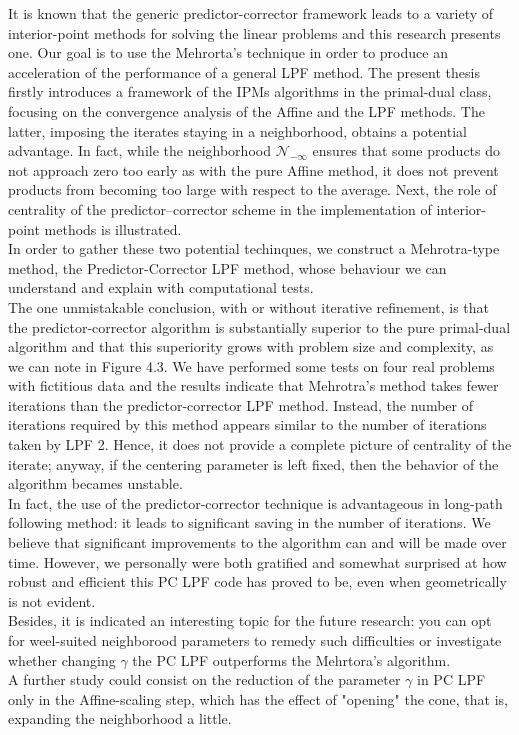 \documentclass[a4paper,10 pt,titlepage,twoside]{report}
\theoremstyle{plain}
\theoremstyle{definition}
\theoremstyle{remark}
\begin{document}
{{It is known that the generic predictor-corrector framework leads to a variety of interior-point methods for solving the linear problems and this research presents one. Our goal is to use the Mehrorta's technique in order to produce an acceleration of the performance of a general LPF method. The present thesis firstly introduces a framework of the IPMs algorithms in
the primal-dual class, focusing on the convergence analysis of the Affine and the LPF methods. The latter, imposing the iterates staying in a neighborhood,  obtains a potential advantage. In fact, while the neighborhood $\mathcal{N}_{-\infty}$ ensures that some products do not approach zero too early as with the pure Affine method, it does not prevent products from becoming too large with respect to the average. Next, the role of centrality of the predictor–corrector scheme in the implementation of interior-point methods is illustrated.\\
In order to gather these two potential techinques, we construct a Mehrotra-type method, the Predictor-Corrector LPF method, whose
behaviour we can understand and explain with computational tests.\\
The one unmistakable conclusion, with or without iterative refinement, is that the predictor-corrector algorithm is substantially superior to the pure primal-dual algorithm and
that this superiority grows with problem size and complexity, as we can note in Figure 4.3. We have performed some tests on four real
problems with fictitious data and the results indicate that Mehrotra's method takes
fewer iterations than the predictor-corrector LPF
method. Instead, the number of iterations required by this method appears similar to the
number of iterations taken by LPF 2.
Hence, it does not provide a complete picture of centrality of the iterate; anyway, if the centering parameter is left fixed, then the behavior of the
algorithm becames unstable.\\
In fact, the use of the predictor-corrector technique is advantageous in long-path following method: it leads to significant saving in the number of iterations. We believe that significant improvements to the algorithm can and will be made over time.
However, we personally were both gratified and somewhat surprised at how robust and
efficient this PC LPF code has proved to be, even when geometrically is not evident. \\
Besides, it is indicated an interesting
topic for the future research: you can opt for weel-suited neighborood parameters to remedy such difficulties or investigate whether changing $\gamma$ the PC LPF outperforms the Mehrtora's algorithm.\\
A further study could consist on the reduction of the parameter $\gamma$ in PC LPF only in the Affine-scaling step, which has the effect of "opening" the cone, that is, expanding the neighborhood a little. 
\appendix
}}
\end{document}

